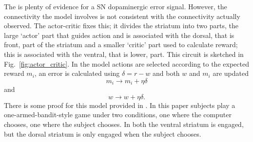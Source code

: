 \documentclass[11pt,a4paper]{scrartcl}
\begin{document}
The is plenty of evidence for a SN dopaminergic error signal. However,
the connectivity the model involves is not consistent with the
connectivity actually observed. The actor-critic fixes this; it
divides the striatum into two parts, the large \lq{}actor\rq{} part
that guides action and is associated with the dorsal, that is front,
part of the striatum and a smaller \lq{}critic\rq{} part used to
calculate reward; this is associated with the ventral, that is lower,
part. This circuit is sketched in Fig.~\ref{fig:actor_critic}. In the
model actions are selected according to the expected reward $m_i$, an
error is calculated using $\delta=r-w$ and both $w$ and $m_i$ are
updated
\begin{equation}
m_i\rightarrow m_i +\eta \delta
\end{equation}
and 
\begin{equation}
w\rightarrow w +\eta \delta.
\end{equation}
There is some proof for this model provided in
\cite{ODohertyEtAl2004a}. In this paper subjects play a
one-armed-bandit-style game under two conditions, one where the
computer chooses, one where the subject chooses. In both the ventral
striatum is engaged, but the dorsal striatum is only engaged when the
subject chooses.
\end{document}
